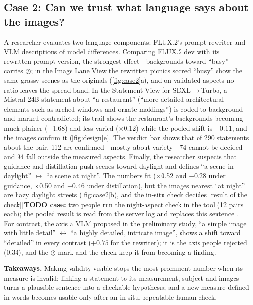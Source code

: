 \documentclass[review]{vgtc}                 %
\newcommand{\pending}[1]{\textcolor{red!70!black}{[#1]}}
\newif\ifdrafttodo \drafttodotrue
\newcommand{\todo}[2]{\ifdrafttodo\textcolor{red!70!black}{\textbf{[TODO #1:} #2\textbf{]}}\fi}
\begin{document}
\subsection{Case 2: Can we trust what language says about the images?}
\label{sec:case2}
A researcher evaluates two language components: FLUX.2's prompt rewriter and VLM descriptions of model differences. Comparing FLUX.2 dev with its rewritten-prompt version, the strongest effect---backgrounds toward ``busy''---carries $\oslash$; in the Image Lane View the rewritten picnics scored ``busy'' show the same grassy scenes as the originals (\cref{fig:case2}a), and on validated aspects no ratio leaves the spread band. In the Statement View for SDXL$\rightarrow$Turbo, a Mistral-24B statement about ``a restaurant'' (``more detailed architectural elements such as arched windows and ornate moldings'') is coded to background and marked contradicted; its trail shows the restaurant's backgrounds becoming much plainer ($-1.68$) and less varied ($\times$0.12) while the pooled shift is $+0.11$, and the images confirm it (\cref{fig:design}e). The verdict bar shows that of 290 statements about the pair, 112 are confirmed---mostly about variety---74 cannot be decided and 94 fall outside the measured aspects. Finally, the researcher suspects that guidance and distillation push scenes toward daylight and defines ``a scene in daylight'' $\leftrightarrow$ ``a scene at night''. The numbers fit ($\times$0.52 and $-0.28$ under guidance, $\times$0.50 and $-0.46$ under distillation), but the images nearest ``at night'' are hazy daylight streets (\cref{fig:case2}b), and the in-situ check decides \pending{result of the check}\todo{case}{two people run the night-aspect check in the tool (12 pairs each); the pooled result is read from the server log and replaces this sentence}. For contrast, the axis a VLM proposed in the preliminary study, ``a simple image with little detail'' $\leftrightarrow$ ``a highly detailed, intricate image'', shows a shift toward ``detailed'' in every contrast ($+0.75$ for the rewriter); it is the axis people rejected (0.34), and the $\oslash$ mark and the check keep it from becoming a finding.

\noindent\textbf{Takeaways.} Making validity visible stops the most prominent number when its measure is invalid; linking a statement to its measurement, subject and images turns a plausible sentence into a checkable hypothesis; and a new measure defined in words becomes usable only after an in-situ, repeatable human check.
\end{document}
